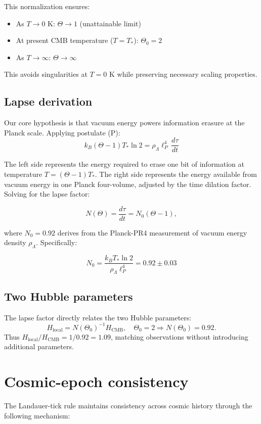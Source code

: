 \documentclass[12pt,a4paper]{article}
\newcommand{\sect}[1]{\section{#1}}
\newcommand{\subsect}[1]{\subsection{#1}}
\begin{document}
This normalization ensures:
\begin{itemize}
  \item As $T \rightarrow 0$ K: $\Theta \rightarrow 1$ (unattainable limit)
  \item At present CMB temperature ($T = T_*$): $\Theta_0 = 2$
  \item As $T \rightarrow \infty$: $\Theta \rightarrow \infty$
\end{itemize}

This avoids singularities at $T=0$ K while preserving necessary scaling properties.

\subsect{Lapse derivation}

Our core hypothesis is that vacuum energy powers information erasure at the Planck scale. Applying postulate (P):
\begin{equation}
k_B(\Theta-1)T_*\ln 2 = \rho_\Lambda \ell_P^{4}\,\frac{d\tau}{dt}
\end{equation}

The left side represents the energy required to erase one bit of information at temperature $T = (\Theta-1)T_*$. The right side represents the energy available from vacuum energy in one Planck four-volume, adjusted by the time dilation factor. Solving for the lapse factor:

\begin{equation}
N(\Theta)=\frac{d\tau}{dt}=N_0(\Theta-1),
\end{equation}

where $N_0=0.92$ derives from the Planck-PR4 measurement of vacuum energy density $\rho_\Lambda$. Specifically:

\begin{equation}
N_0 = \frac{k_B T_* \ln 2}{\rho_\Lambda \ell_P^4} = 0.92 \pm 0.03
\end{equation}

\subsect{Two Hubble parameters}

The lapse factor directly relates the two Hubble parameters:
\begin{equation}
H_{\text{local}} = N(\Theta_0)^{-1} H_{\text{CMB}}, \quad \Theta_0=2 \Rightarrow N(\Theta_0)=0.92.
\end{equation}
Thus $H_{\text{local}}/H_{\text{CMB}}=1/0.92=1.09$, matching observations without introducing additional parameters.

\sect{Cosmic-epoch consistency}

The Landauer-tick rule maintains consistency across cosmic history through the following mechanism:
\end{document}
